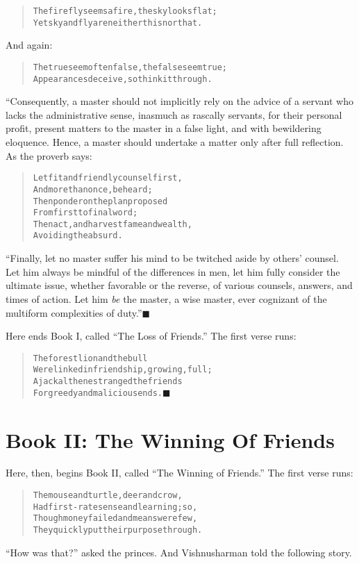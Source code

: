 \documentclass[article, twoside, 14pt]{memoir}
\newcommand{\qed}{\hfill \ensuremath{\blacksquare}}
\renewenvironment{verbatim}{%
\begin{quote}%
\vskip -10pt%
\begin{alltt}\normalfont\large}{\end{alltt}%
\end{quote}%
\vskip -10pt
} %
\begin{document}
\begin{verbatim}
The firefly seems a fire, the sky looks flat;
Yet sky and fly are neither this nor that.
\end{verbatim}
And again:

\begin{verbatim}
The true seem often false, the false seem true;
Appearances deceive, so think it through.
\end{verbatim}
“Consequently, a master should not implicitly rely on the advice of
a servant who lacks the administrative sense, inasmuch as rascally
servants, for their personal profit, present matters to the master
in a false light, and with bewildering eloquence. Hence, a master
should undertake a matter only after full reflection. As the
proverb says:

\begin{verbatim}
Let fit and friendly counsel first,
    And more than once, be heard;
Then ponder on the plan proposed
    From first to final word;
Then act, and harvest fame and wealth,
    Avoiding the absurd.
\end{verbatim}
``Finally, let no master suffer his mind to be twitched aside by others' counsel. Let him always be mindful of the differences in men, let him fully consider the ultimate issue, whether favorable or the reverse, of various counsels, answers, and times of action. Let him \emph{be} the master, a wise master, ever cognizant of the multiform complexities of duty.''\hyperref[s5]{\qed}

Here ends Book I, called ``The Loss of Friends.'' The first verse
runs:

\begin{verbatim}
The forest lion and the bull
Were linked in friendship, growing, full;
A jackal then estranged the friends
For greedy and malicious ends.\hyperref[s1]{\qed}
\end{verbatim}
\part{Book II: The Winning Of Friends}

\label{s35}

Here, then, begins Book II, called
``The Winning of Friends.'' The first verse runs:

\begin{verbatim}
The mouse and turtle, deer and crow,
Had first-rate sense and learning; so,
Though money failed and means were few,
They quickly put their purpose through.
\end{verbatim}
``How was that?'' asked the princes. And Vishnusharman told the
following story.
\end{document}
